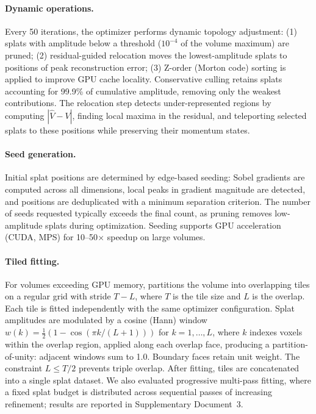 \paragraph{Dynamic operations.}
Every 50 iterations, the optimizer performs dynamic topology adjustment: (1) splats with amplitude below a threshold ($10^{-4}$ of the volume maximum) are pruned; (2) residual-guided relocation moves the lowest-amplitude splats to positions of peak reconstruction error; (3) Z-order (Morton code) sorting is applied to improve GPU cache locality.
Conservative culling retains splats accounting for 99.9\% of cumulative amplitude, removing only the weakest contributions.
The relocation step detects under-represented regions by computing $|\hat{V} - V|$, finding local maxima in the residual, and teleporting selected splats to these positions while preserving their momentum states.

\paragraph{Seed generation.}
Initial splat positions are determined by edge-based seeding: Sobel gradients are computed across all dimensions, local peaks in gradient magnitude are detected, and positions are deduplicated with a minimum separation criterion.
The number of seeds requested typically exceeds the final count, as pruning removes low-amplitude splats during optimization.
Seeding supports GPU acceleration (CUDA, MPS) for 10--50$\times$ speedup on large volumes.

\paragraph{Tiled fitting.}
For volumes exceeding GPU memory, \luxar partitions the volume into overlapping tiles on a regular grid with stride $T - L$, where $T$ is the tile size and $L$ is the overlap.
Each tile is fitted independently with the same optimizer configuration.
Splat amplitudes are modulated by a cosine (Hann) window $w(k) = \frac{1}{2}(1 - \cos(\pi k / (L+1)))$ for $k = 1, \ldots, L$, where $k$ indexes voxels within the overlap region, applied along each overlap face, producing a partition-of-unity: adjacent windows sum to 1.0.
Boundary faces retain unit weight.
The constraint $L \leq T/2$ prevents triple overlap.
After fitting, tiles are concatenated into a single splat dataset.
We also evaluated progressive multi-pass fitting, where a fixed splat budget is distributed across sequential passes of increasing refinement; results are reported in Supplementary Document~3.

